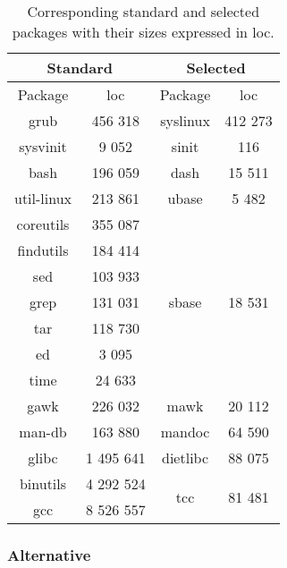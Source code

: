 \begin{table}[!h]
    \centering
    \begin{tabular}{|c|c||c|c|}
        \hline
        \multicolumn{2}{|c||}{Standard} & \multicolumn{2}{|c|}{Selected} \\
        \hline
        \hline
        Package & \gls{loc} & Package & \gls{loc} \\
        \hline
        \hline
        grub \cite{grub} & 456 318 & syslinux \cite{syslinux} & 412 273 \\
        \hline
        sysvinit \cite{sysvinit} & 9 052 & sinit \cite{sinit} & 116 \\
        \hline
        bash \cite{bash} & 196 059 & dash \cite{dash} & 15 511 \\
        \hline
        util-linux \cite{util-linux} & 213 861 & ubase \cite{ubase} & 5 482 \\
        \hline
        coreutils \cite{coreutils} & 355 087 & \multirow{7}{*}{sbase \cite{sbase}} & \multirow{7}{*}{18 531} \\
        findutils \cite{findutils} & 184 414 & & \\
        sed \cite{sed} & 103 933 & & \\
        grep \cite{grep} & 131 031 & & \\
        tar \cite{tar} & 118 730 & & \\
        ed \cite{ed} & 3 095 & & \\
        time \cite{time} & 24 633 & & \\
        \hline
        gawk \cite{gawk} & 226 032 & mawk \cite{mawk} & 20 112 \\
        \hline
        man-db \cite{man-db} & 163 880 & mandoc \cite{mandoc} & 64 590 \\
        \hline
        glibc \cite{glibc} & 1 495 641 & dietlibc \cite{dietlibc} & 88 075 \\
        \hline
        binutils \cite{binutils} & 4 292 524 & \multirow{2}{*}{tcc \cite{tcc}} & \multirow{2}{*}{81 481} \\
        gcc \cite{gcc} & 8 526 557 & & \\
        \hline
    \end{tabular}
    \caption{Corresponding standard and selected packages with their sizes expressed in \gls{loc}.}
\end{table}

\newpage

\subsubsection{Alternative}

